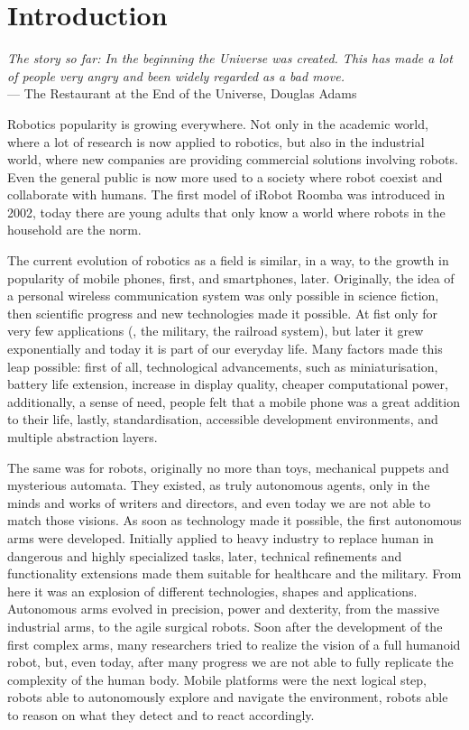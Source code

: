 \chapter{Introduction}\label{ch:introduction}

\begin{flushright}{\slshape The story so far: In the beginning the Universe was created. This has made a lot of people very angry and been widely regarded as a bad move.} \\ \medskip
    ---  The Restaurant at the End of the Universe, Douglas Adams 
\end{flushright}

Robotics popularity is growing everywhere. Not only in the academic world, where a lot of research is now applied to robotics, but also in the industrial world, where new companies are providing commercial solutions involving robots. Even the general public is now more used to a society where robot coexist and collaborate with humans. The first model of iRobot Roomba was introduced in 2002, today there are young adults that only know a world where robots in the household are the norm.

The current evolution of robotics as a field is similar, in a way, to the growth in popularity of mobile phones, first, and smartphones, later.  Originally, the idea of a personal wireless communication system was only possible in science fiction, then scientific progress and new technologies made it possible. At fist only for very few applications (\eg, the military, the railroad system), but later it grew exponentially and today it is part of our everyday life. Many factors made this leap possible: first of all, technological advancements, such as miniaturisation, battery life extension, increase in display quality, cheaper computational power, additionally, a sense of need, people felt that a mobile phone was a great addition to their life, lastly, standardisation, accessible development environments, and multiple abstraction layers.

The same was for robots, originally no more than toys, mechanical puppets and mysterious automata. They existed, as truly autonomous agents, only in the minds and works of writers and directors, and even today we are not able to match those visions. As soon as technology made it possible, the first autonomous arms were developed. Initially applied to heavy industry to replace human in dangerous and highly specialized tasks, later, technical refinements and functionality extensions made them suitable for healthcare and the military. From here it was an explosion of different technologies, shapes and applications. Autonomous arms evolved in precision, power and dexterity,  from the massive industrial arms, to the agile surgical robots.  Soon after the development of the first complex arms, many researchers tried to realize the vision of a full humanoid robot, but, even today, after many progress we are not able to fully replicate the complexity of the human body. Mobile platforms were the next logical step, robots able to autonomously explore and navigate the environment, robots able to reason on what they detect and to react accordingly.

